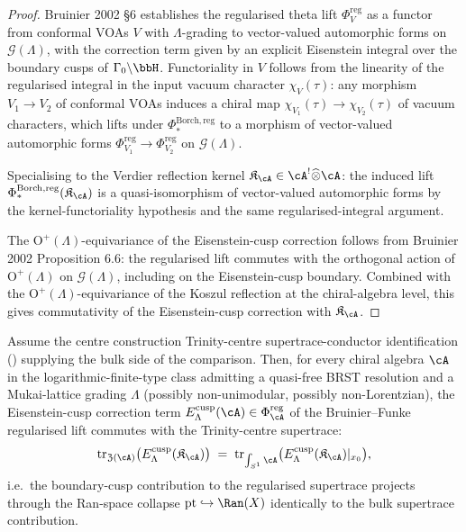 \begin{proof}
Bruinier 2002 \S 6 establishes the regularised theta lift
$\Phi_V^{\mathrm{reg}}$ as a functor from conformal VOAs $V$ with
$\Lambda$-grading to vector-valued automorphic forms on
$\mathcal{G}(\Lambda)$, with the correction term given by an explicit
Eisenstein integral over the boundary cusps of $\Gamma_0 \backslash \bbH$.
Functoriality in $V$ follows from the linearity of the regularised integral
in the input vacuum character $\chi_V(\tau)$: any morphism $V_1 \to V_2$
of conformal VOAs induces a chiral map $\chi_{V_1}(\tau) \to \chi_{V_2}(\tau)$
of vacuum characters, which lifts under
$\Phi^{\mathrm{Borch}, \mathrm{reg}}_*$ to a morphism of vector-valued
automorphic forms $\Phi^{\mathrm{reg}}_{V_1} \to \Phi^{\mathrm{reg}}_{V_2}$
on $\mathcal{G}(\Lambda)$.

Specialising to the Verdier reflection kernel
$\mathfrak{K}_\cA \in \cA^! \widehat\otimes \cA$: the induced lift
$\Phi^{\mathrm{Borch}, \mathrm{reg}}_*(\mathfrak{K}_\cA)$ is a quasi-isomorphism
of vector-valued automorphic forms by the kernel-functoriality
hypothesis and the same regularised-integral argument.

The $\mathrm{O}^+(\Lambda)$-equivariance of the Eisenstein-cusp correction
follows from Bruinier 2002 Proposition 6.6: the regularised lift commutes
with the orthogonal action of $\mathrm{O}^+(\Lambda)$ on $\mathcal{G}(\Lambda)$,
including on the Eisenstein-cusp boundary. Combined with the
$\mathrm{O}^+(\Lambda)$-equivariance of the Koszul reflection at the
chiral-algebra level, this gives commutativity of the Eisenstein-cusp
correction with $\mathfrak{K}_\cA$.
\end{proof}

\begin{proposition}
\label{prop:eisenstein-cusp-trinity-supertrace}
Assume the centre construction Trinity-centre supertrace-conductor identification
\textup{(}\cite{VolII}\textup{)}
supplying the bulk side of the comparison. Then, for every chiral
algebra $\cA$ in the logarithmic-finite-type class
admitting a quasi-free BRST resolution and a Mukai-lattice grading
$\Lambda$ \textup{(}possibly non-unimodular, possibly non-Lorentzian\textup{),}
the Eisenstein-cusp correction term
$E_\Lambda^{\mathrm{cusp}}(\cA) \in \Phi^{\mathrm{reg}}_\cA$ of the
Bruinier--Funke regularised lift commutes with the Trinity-centre
supertrace:
\[
 \mathrm{tr}_{\mathfrak{Z}(\cA)}\bigl(E_\Lambda^{\mathrm{cusp}}(\mathfrak{K}_\cA)\bigr)
 \;=\; \mathrm{tr}_{\int_{S^1} \cA}\bigl(E_\Lambda^{\mathrm{cusp}}(\mathfrak{K}_\cA)|_{x_0}\bigr),
\]
i.e.\ the boundary-cusp contribution to the regularised supertrace
projects through the Ran-space collapse $\mathrm{pt} \hookrightarrow \Ran(X)$
identically to the bulk supertrace contribution.
\end{proposition}

